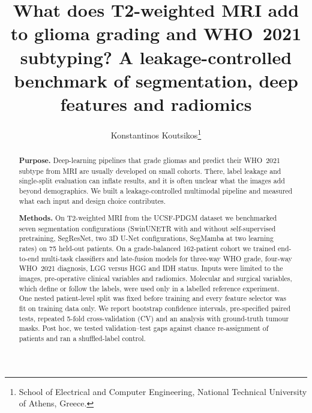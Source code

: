 \documentclass[11pt]{article}
\title{What does T2-weighted MRI add to glioma grading and WHO~2021 subtyping? A leakage-controlled benchmark of
segmentation, deep features and radiomics}
\author{Konstantinos Koutsikos\thanks{School of Electrical and Computer Engineering, National Technical
University of Athens, Greece. \todo{co-authors, e-mail}}}
\date{}
\begin{document}
\maketitle

\begin{abstract}
\noindent\textbf{Purpose.} Deep-learning pipelines that grade gliomas and predict their WHO~2021 subtype from MRI
are usually developed on small cohorts. There, label leakage and single-split evaluation can inflate results, and it
is often unclear what the images add beyond demographics. We built a leakage-controlled multimodal pipeline and
measured what each input and design choice contributes.

\noindent\textbf{Methods.} On T2-weighted MRI from the UCSF-PDGM dataset we benchmarked seven segmentation
configurations (SwinUNETR with and without self-supervised pretraining, SegResNet, two 3D U-Net configurations,
SegMamba at two learning rates) on 75 held-out patients. On a grade-balanced 162-patient cohort we trained
end-to-end multi-task classifiers and late-fusion models for three-way WHO grade, four-way WHO~2021 diagnosis, LGG
versus HGG and IDH status. Inputs were limited to the images, pre-operative clinical variables and radiomics.
Molecular and surgical variables, which define or follow the labels, were used only in a labelled reference
experiment. One nested patient-level split was fixed before training and every feature selector was fit on training
data only. We report bootstrap confidence intervals, pre-specified paired tests, repeated 5-fold cross-validation
(CV) and an analysis with ground-truth tumour masks. Post hoc, we tested validation--test gaps against chance
re-assignment of patients and ran a shuffled-label control.


\end{abstract}
\end{document}
